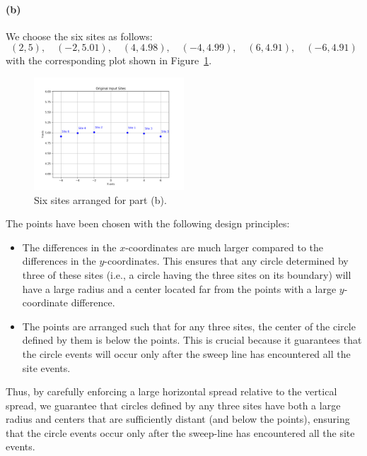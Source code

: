 \documentclass[12pt]{article}
\begin{document}
\paragraph{(b)}
We choose the six sites as follows:
\[
(2, 5),\quad (-2, 5.01),\quad (4, 4.98),\quad (-4, 4.99),\quad (6, 4.91),\quad (-6, 4.91)
\]
with the corresponding plot shown in Figure~\ref{fig:1b_sites}.

\begin{figure}[H]
    \centering
    \includegraphics[width=0.5\textwidth]{img/1b.png}
    \caption{Six sites arranged for part (b).}
    \label{fig:1b_sites}
\end{figure}

The points have been chosen with the following design principles:
\begin{itemize}
    \item The differences in the $x$-coordinates are much larger compared to the differences in the $y$-coordinates. This ensures that any circle determined by three of these sites (i.e., a circle having the three sites on its boundary) will have a large radius and a center located far from the points with a large $y$-coordinate difference.
    \item The points are arranged such that for any three sites, the center of the circle defined by them is below the points. This is crucial because it guarantees that the circle events will occur only after the sweep line has encountered all the site events.
\end{itemize}

Thus, by carefully enforcing a large horizontal spread relative to the vertical spread, we guarantee that circles defined by any three sites have both a large radius and centers that are sufficiently distant (and below the points), ensuring that the circle events occur only after the sweep-line has encountered all the site events.
\end{document}
